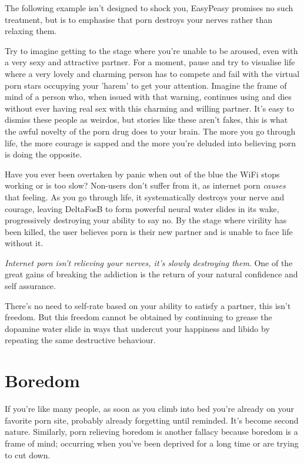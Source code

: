 \documentclass[
]{book}
\begin{document}
The following example isn't designed to shock you, EasyPeasy promises no such treatment, but is to emphasise that porn destroys your nerves rather than relaxing them.

Try to imagine getting to the stage where you're unable to be aroused, even with a very sexy and attractive partner. For a moment, pause and try to visualise life where a very lovely and charming person has to compete and fail with the virtual porn stars occupying your 'harem' to get your attention. Imagine the frame of mind of a person who, when issued with that warning, continues using and dies without ever having real sex with this charming and willing partner. It's easy to dismiss these people as weirdos, but stories like these aren't fakes, this is what the awful novelty of the porn drug does to your brain. The more you go through life, the more courage is sapped and the more you're deluded into believing porn is doing the opposite.

Have you ever been overtaken by panic when out of the blue the WiFi stops working or is too slow? Non-users don't suffer from it, as internet porn \emph{causes} that feeling. As you go through life, it systematically destroys your nerve and courage, leaving DeltaFosB to form powerful neural water slides in its wake, progressively destroying your ability to say no. By the stage where virility has been killed, the user believes porn is their new partner and is unable to face life without it.

\emph{Internet porn isn't relieving your nerves, it's slowly destroying them}. One of the great gains of breaking the addiction is the return of your natural confidence and self assurance.

There's no need to self-rate based on your ability to satisfy a partner, this isn't freedom. But this freedom cannot be obtained by continuing to grease the dopamine water slide in ways that undercut your happiness and libido by repeating the same destructive behaviour.

\hypertarget{boredom}{%
\section{Boredom}\label{boredom}}

If you're like many people, as soon as you climb into bed you're already on your favorite porn site, probably already forgetting until reminded. It's become second nature. Similarly, porn relieving boredom is another fallacy because boredom is a frame of mind; occurring when you've been deprived for a long time or are trying to cut down.
\end{document}
